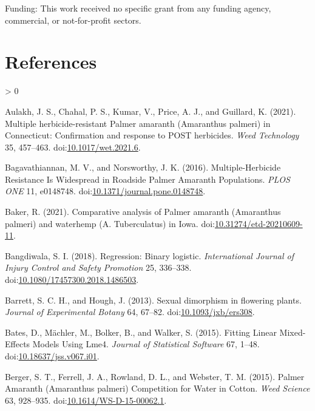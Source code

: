 \documentclass[utf8]{frontiersSCNS}
\newlength{\cslhangindent}
\newenvironment{CSLReferences}[2] %
 {%
  \setlength{\parindent}{0pt}
  \ifodd #1 \everypar{\setlength{\hangindent}{\cslhangindent}}\ignorespaces\fi
  \ifnum #2 > 0
  \setlength{\parskip}{#2\baselineskip}
  \fi
 }%
 {}
\begin{document}
Funding: This work received no specific grant from any funding agency,
commercial, or not-for-profit sectors.

\hypertarget{references}{%
\section*{References}\label{references}}

\hypertarget{refs}{}
\begin{CSLReferences}{1}{0}
\leavevmode\hypertarget{ref-aulakh2021}{}%
Aulakh, J. S., Chahal, P. S., Kumar, V., Price, A. J., and Guillard, K.
(2021). Multiple herbicide-resistant {Palmer} amaranth ({Amaranthus}
palmeri) in {Connecticut}: Confirmation and response to {POST}
herbicides. \emph{Weed Technology} 35, 457--463.
doi:\href{https://doi.org/10.1017/wet.2021.6}{10.1017/wet.2021.6}.

\leavevmode\hypertarget{ref-bagavathiannan2016}{}%
Bagavathiannan, M. V., and Norsworthy, J. K. (2016). Multiple-{Herbicide
Resistance Is Widespread} in {Roadside Palmer Amaranth Populations}.
\emph{PLOS ONE} 11, e0148748.
doi:\href{https://doi.org/10.1371/journal.pone.0148748}{10.1371/journal.pone.0148748}.

\leavevmode\hypertarget{ref-baker2021}{}%
Baker, R. (2021). Comparative analysis of {Palmer} amaranth
({Amaranthus} palmeri) and waterhemp ({A}. Tuberculatus) in {Iowa}.
doi:\href{https://doi.org/10.31274/etd-20210609-11}{10.31274/etd-20210609-11}.

\leavevmode\hypertarget{ref-bangdiwala2018}{}%
Bangdiwala, S. I. (2018). Regression: Binary logistic.
\emph{International Journal of Injury Control and Safety Promotion} 25,
336--338.
doi:\href{https://doi.org/10.1080/17457300.2018.1486503}{10.1080/17457300.2018.1486503}.

\leavevmode\hypertarget{ref-barrett2013}{}%
Barrett, S. C. H., and Hough, J. (2013). Sexual dimorphism in flowering
plants. \emph{Journal of Experimental Botany} 64, 67--82.
doi:\href{https://doi.org/10.1093/jxb/ers308}{10.1093/jxb/ers308}.

\leavevmode\hypertarget{ref-bates2015}{}%
Bates, D., Mächler, M., Bolker, B., and Walker, S. (2015). Fitting
{Linear Mixed}-{Effects Models Using} Lme4. \emph{Journal of Statistical
Software} 67, 1--48.
doi:\href{https://doi.org/10.18637/jss.v067.i01}{10.18637/jss.v067.i01}.

\leavevmode\hypertarget{ref-berger2015}{}%
Berger, S. T., Ferrell, J. A., Rowland, D. L., and Webster, T. M.
(2015). Palmer {Amaranth} ({Amaranthus} palmeri) {Competition} for
{Water} in {Cotton}. \emph{Weed Science} 63, 928--935.
doi:\href{https://doi.org/10.1614/WS-D-15-00062.1}{10.1614/WS-D-15-00062.1}.


\end{CSLReferences}
\end{document}
